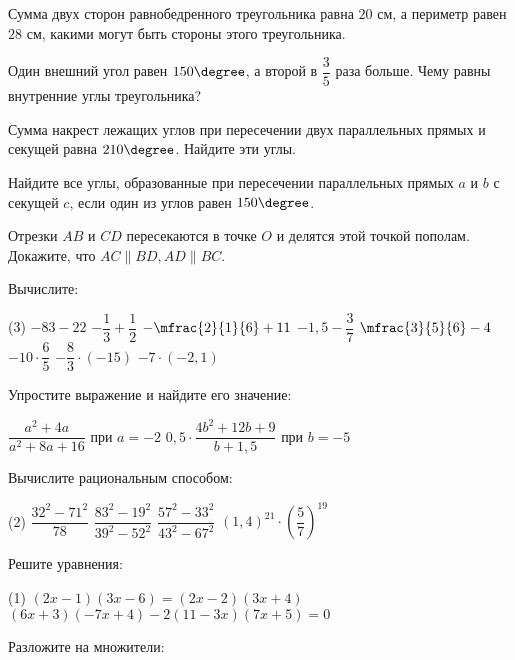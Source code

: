 \begin{class}[number=3]
	\begin{listofex}
		\item Сумма двух сторон равнобедренного треугольника равна \( 20 \) см, а периметр равен \( 28 \) см, какими могут быть стороны этого треугольника.
		\item Один внешний угол равен \( 150\degree \), а второй в \( \dfrac{ 3 }{ 5 } \) раза больше. Чему равны внутренние углы треугольника?
		\item Сумма накрест лежащих углов при пересечении двух параллельных прямых и секущей равна \(210 \degree \). Найдите эти углы.
		\item Найдите все углы, образованные при пересечении параллельных прямых \(a\) и \(b\) с секущей \(c\), если один из углов равен \( 150 \degree \).
		\item Отрезки \(AB\) и \(CD\) пересекаются в точке \(O\) и делятся этой точкой пополам. Докажите, что \(AC \parallel BD, AD \parallel BC\).
		\item Вычислите:
		\begin{tasks}(3)
			\task \( -83-22 \)
			\task \( -\dfrac{1}{3}+\dfrac{1}{2} \)
			\task \( -\mfrac{2}{1}{6}+11 \)
			\task \( -1,5-\dfrac{3}{7} \)
			\task \( \mfrac{3}{5}{6}-4 \)
			\task \( -10 \cdot \dfrac{6}{5} \)
			\task \( -\dfrac{8}{3} \cdot (-15) \)
			\task \( -7 \cdot (-2,1) \)
		\end{tasks}
		\item Упростите выражение и найдите его значение:
		\begin{tasks}
			\task \( \dfrac{a^2+4a}{a^2+8a+16} \) при \(a=-2\)
			\task \( 0,5 \cdot \dfrac{4b^2+12b+9}{b+1,5} \) при \(b=-5\)
		\end{tasks}
		\item Вычислите рациональным способом:
		\begin{tasks}(2)
			\task \( \dfrac{32^2-71^2}{78}  \)
			\task \( \dfrac{83^2-19^2}{39^2-52^2} \)
			\task \( \dfrac{57^2-33^2}{43^2-67^2} \)
			\task \( (1,4)^{21} \cdot \left( \dfrac{5}{7} \right)^{19} \)
		\end{tasks}
		\item Решите уравнения:
		\begin{tasks}(1)
			\task \( (2x-1)(3x-6)=(2x-2)(3x+4) \)
			\task \( (6x+3)(-7x+4) - 2(11-3x)(7x+5)=0 \)
		\end{tasks}
		\item Разложите на множители: %

\end{listofex}
\end{class}
